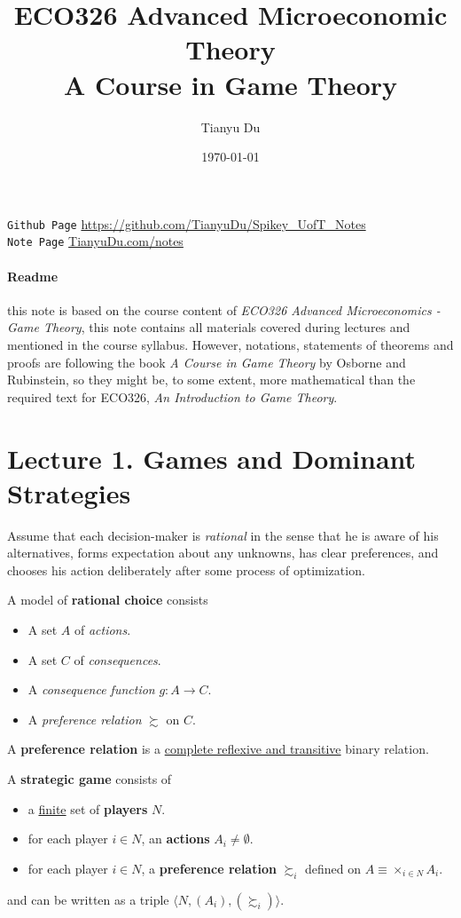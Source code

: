 \documentclass[11pt]{article}
\title{ECO326 Advanced Microeconomic Theory \\ \small A Course in Game Theory}
\author{Tianyu Du}
\date{\today}
\begin{document}
	\maketitle
	\doclicenseThis
	\texttt{Github Page} \url{https://github.com/TianyuDu/Spikey_UofT_Notes}\\
	\texttt{Note Page} \url{TianyuDu.com/notes}
	\paragraph{Readme} this note is based on the course content of \emph{ECO326 Advanced Microeconomics - Game Theory}, this note contains all materials covered during lectures and mentioned in the course syllabus. However, notations, statements of theorems and proofs are following the book \emph{A Course in Game Theory} by Osborne and Rubinstein, so they might be, to some extent, more mathematical than the required text for ECO326, \emph{An Introduction to Game Theory}.
	
	\tableofcontents
	\section{Lecture 1. Games and Dominant Strategies}
		\begin{assumption}[pg.4]
			Assume that each decision-maker is \emph{rational} in the sense that he is aware of his alternatives, forms expectation about any unknowns, has clear preferences, and chooses his action deliberately after some process of optimization.
		\end{assumption}
		
		\begin{definition}[pg.4]
			A model of \textbf{rational choice} consists
			\begin{itemize}
				\item A set $A$ of \emph{actions}.
				\item A set $C$ of \emph{consequences}.
				\item A \emph{consequence function} $g: A \to C$.
				\item A \emph{preference relation} $\succsim$ on $C$.
			\end{itemize}
		\end{definition}
		
		\begin{definition}[pg.7]
			A \textbf{preference relation} is a \ul{complete reflexive and transitive} binary relation.
		\end{definition}
\begin{definition}[11.1]
			A \textbf{strategic game} consists of
			\begin{itemize}
				\item a \ul{finite} set of \textbf{players} $N$.
				\item for each player $i \in N$, an \textbf{actions} $A_i \neq \emptyset$.
				\item for each player $i \in N$, a \textbf{preference relation} $\succsim_i$ defined on $A \equiv \times_{i\in N}A_i$.
			\end{itemize}
			and can be written as a triple $\langle N, (A_i), (\succsim_i) \rangle$.
		\end{definition}
		
\end{document}
